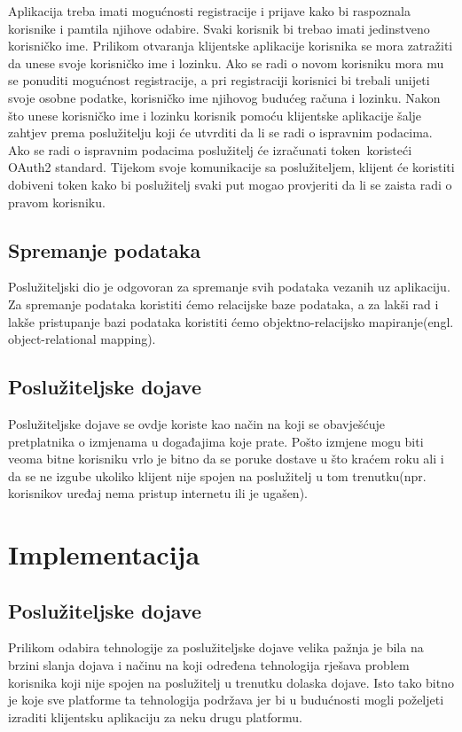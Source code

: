 \documentclass[times, utf8, zavrsni]{fer}
\begin{document}
Aplikacija treba imati mogućnosti registracije i prijave kako bi raspoznala korisnike i pamtila njihove odabire. Svaki korisnik bi trebao imati jedinstveno korisničko ime. Prilikom otvaranja klijentske aplikacije korisnika se mora zatražiti da unese svoje korisničko ime i lozinku. Ako se radi o novom korisniku mora mu se ponuditi mogućnost registracije, a pri registraciji korisnici bi trebali unijeti svoje osobne podatke, korisničko ime njihovog budućeg računa i lozinku. Nakon što unese korisničko ime i lozinku korisnik pomoću klijentske aplikacije šalje zahtjev prema poslužitelju koji će utvrditi da li se radi o ispravnim podacima. Ako se radi o ispravnim podacima poslužitelj će izračunati \glqq token\grqq\  koristeći OAuth2 standard. Tijekom svoje komunikacije sa poslužiteljem, klijent će koristiti dobiveni token kako bi poslužitelj svaki put mogao provjeriti da li se zaista radi o pravom korisniku.

\section{Spremanje podataka}

Poslužiteljski dio je odgovoran za spremanje svih podataka vezanih uz aplikaciju. Za spremanje podataka koristiti ćemo relacijske baze podataka, a za lakši rad i lakše pristupanje bazi podataka koristiti ćemo objektno-relacijsko mapiranje(engl. object-relational mapping).

\section{Poslužiteljske dojave}

Poslužiteljske dojave se ovdje koriste kao način na koji se obavješćuje pretplatnika o izmjenama u događajima koje prate. Pošto izmjene mogu biti veoma bitne korisniku vrlo je bitno da se poruke dostave u što kraćem roku ali i da se ne izgube ukoliko klijent nije spojen na poslužitelj u tom trenutku(npr. korisnikov uređaj nema pristup internetu ili je ugašen).

\chapter{Implementacija}

\section{Poslužiteljske dojave}

Prilikom odabira tehnologije za poslužiteljske dojave velika pažnja je bila na brzini slanja dojava i načinu na koji određena tehnologija rješava problem korisnika koji nije spojen na poslužitelj u trenutku dolaska dojave. Isto tako bitno je koje sve platforme ta tehnologija podržava jer bi u budućnosti mogli poželjeti izraditi klijentsku aplikaciju za neku drugu platformu.
\end{document}
